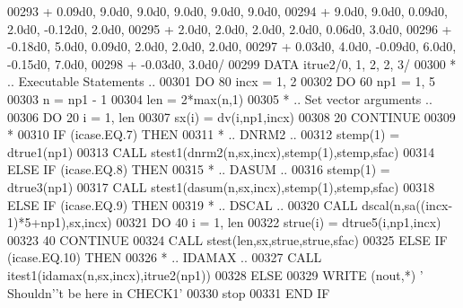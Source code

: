\begin{DoxyCode}
00293      +                  0.09d0, 9.0d0, 9.0d0, 9.0d0, 9.0d0, 9.0d0,
00294      +                  9.0d0, 9.0d0, 0.09d0, 2.0d0, -0.12d0, 2.0d0,
00295      +                  2.0d0, 2.0d0, 2.0d0, 2.0d0, 0.06d0, 3.0d0,
00296      +                  -0.18d0, 5.0d0, 0.09d0, 2.0d0, 2.0d0, 2.0d0,
00297      +                  0.03d0, 4.0d0, -0.09d0, 6.0d0, -0.15d0, 7.0d0,
00298      +                  -0.03d0, 3.0d0/
00299       \textcolor{keyword}{DATA}              itrue2/0, 1, 2, 2, 3/
00300 \textcolor{comment}{*     .. Executable Statements ..}
00301       \textcolor{keywordflow}{DO} 80 incx = 1, 2
00302          \textcolor{keywordflow}{DO} 60 np1 = 1, 5
00303             n = np1 - 1
00304             len = 2*max(n,1)
00305 \textcolor{comment}{*           .. Set vector arguments ..}
00306             \textcolor{keywordflow}{DO} 20 i = 1, len
00307                sx(i) = dv(i,np1,incx)
00308    20       \textcolor{keywordflow}{CONTINUE}
00309 \textcolor{comment}{*}
00310             \textcolor{keywordflow}{IF} (icase.EQ.7) \textcolor{keywordflow}{THEN}
00311 \textcolor{comment}{*              .. DNRM2 ..}
00312                stemp(1) = dtrue1(np1)
00313                \textcolor{keyword}{CALL }stest1(dnrm2(n,sx,incx),stemp(1),stemp,sfac)
00314             \textcolor{keywordflow}{ELSE} \textcolor{keywordflow}{IF} (icase.EQ.8) \textcolor{keywordflow}{THEN}
00315 \textcolor{comment}{*              .. DASUM ..}
00316                stemp(1) = dtrue3(np1)
00317                \textcolor{keyword}{CALL }stest1(dasum(n,sx,incx),stemp(1),stemp,sfac)
00318             \textcolor{keywordflow}{ELSE} \textcolor{keywordflow}{IF} (icase.EQ.9) \textcolor{keywordflow}{THEN}
00319 \textcolor{comment}{*              .. DSCAL ..}
00320                \textcolor{keyword}{CALL }dscal(n,sa((incx-1)*5+np1),sx,incx)
00321                \textcolor{keywordflow}{DO} 40 i = 1, len
00322                   strue(i) = dtrue5(i,np1,incx)
00323    40          \textcolor{keywordflow}{CONTINUE}
00324                \textcolor{keyword}{CALL }stest(len,sx,strue,strue,sfac)
00325             \textcolor{keywordflow}{ELSE} \textcolor{keywordflow}{IF} (icase.EQ.10) \textcolor{keywordflow}{THEN}
00326 \textcolor{comment}{*              .. IDAMAX ..}
00327                \textcolor{keyword}{CALL }itest1(idamax(n,sx,incx),itrue2(np1))
00328             \textcolor{keywordflow}{ELSE}
00329                \textcolor{keyword}{WRITE} (nout,*) \textcolor{stringliteral}{' Shouldn'}\textcolor{stringliteral}{'t be here in CHECK1'}
00330                stop
00331 \textcolor{keywordflow}{            END IF}

\end{DoxyCode}
